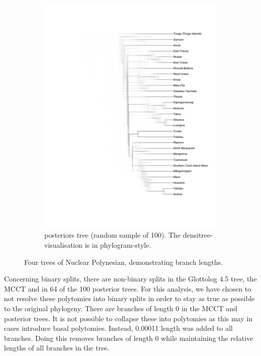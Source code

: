 \documentclass[12pt,letterpaper]{article}
\begin{document}
\begin{figure}[ht]
\begin{subfigure}{0.5\linewidth}
          \includegraphics[width=\textwidth]{illustrations/plots_from_R/tree_plots/poly_tree_example_brlen_gray_posterios.png}
    \caption{\citet{grayetal_2009} posteriors tree (random sample of 100). The densitree-visualisation is in phylogram-style.}
     \label{gray_tree_branch_example_posteriors}
    \end{subfigure}
    
\caption{Four trees of Nuclear Polynesian, demonstrating branch lengths.}
    \label{fig:branch_lengths}
\end{figure}

Concerning binary splits, there are non-binary splits in the Glottolog 4.5 tree, the \citet{grayetal_2009} MCCT and in 64 of the 100 posterior trees. For this analysis, we have chosen to not resolve these polytomies into binary splits in order to stay as true as possible to the original phylogeny. There are branches of length 0 in the MCCT and posterior trees. It is not possible to collapse these into polytomies as this may in cases introduce basal polytomies. Instead, 0.00011 length was added to all branches. Doing this removes branches of length 0 while maintaining the relative lengths of all branches in the tree.
\end{document}
